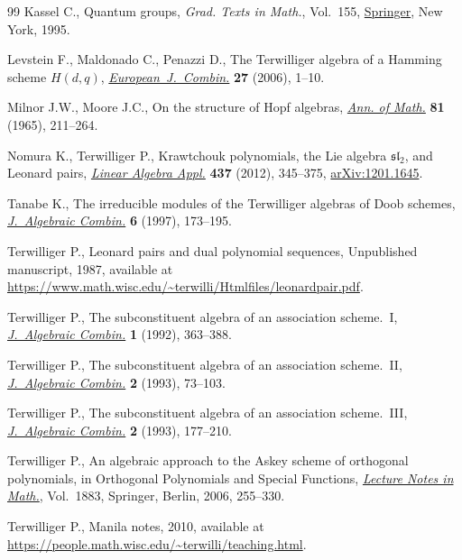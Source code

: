 \documentclass[pdftex]{sigma}%
\numberwithin{equation}{section}
\begin{document}
\begin{thebibliography}{99}
Kassel C., Quantum groups, \textit{Grad. Texts in Math.}, Vol.~155, \href{https://doi.org/10.1007/978-1-4612-0783-2}{Springer},
 New York, 1995.

Levstein F., Maldonado C., Penazzi D., The {T}erwilliger algebra of a {H}amming
 scheme {$H(d,q)$}, \href{https://doi.org/10.1016/j.ejc.2004.08.005}{\textit{European~J.~Combin.}} \textbf{27} (2006), 1--10.

Milnor J.W., Moore J.C., On the structure of {H}opf algebras, \href{https://doi.org/10.2307/1970615}{\textit{Ann. of
 Math.}} \textbf{81} (1965), 211--264.

Nomura K., Terwilliger P., Krawtchouk polynomials, the {L}ie algebra
 {$\mathfrak{sl}_2$}, and {L}eonard pairs, \href{https://doi.org/10.1016/j.laa.2012.02.006}{\textit{Linear Algebra Appl.}}
 \textbf{437} (2012), 345--375, \href{https://arxiv.org/abs/1201.1645}{arXiv:1201.1645}.

Tanabe K., The irreducible modules of the {T}erwilliger algebras of {D}oob
 schemes, \href{https://doi.org/10.1023/A:1008647205853}{\textit{J.~Algebraic Combin.}} \textbf{6} (1997), 173--195.

Terwilliger P., Leonard pairs and dual polynomial sequences, {U}npublished
 manuscript, 1987, available at
 \url{https://www.math.wisc.edu/~terwilli/Htmlfiles/leonardpair.pdf}.

Terwilliger P., The subconstituent algebra of an association scheme.~{I},
 \href{https://doi.org/10.1023/A:1022494701663}{\textit{J.~Algebraic Combin.}} \textbf{1} (1992), 363--388.

Terwilliger P., The subconstituent algebra of an association scheme.~{II},
 \href{https://doi.org/10.1023/A:1022480715311}{\textit{J.~Algebraic Combin.}} \textbf{2} (1993), 73--103.

Terwilliger P., The subconstituent algebra of an association scheme.~{III},
 \href{https://doi.org/10.1023/A:1022415825656}{\textit{J.~Algebraic Combin.}} \textbf{2} (1993), 177--210.

Terwilliger P., An algebraic approach to the {A}skey scheme of orthogonal
 polynomials, in Orthogonal Polynomials and Special Functions, \href{https://doi.org/10.1007/978-3-540-36716-1_6}{\textit{Lecture
 Notes in Math.}}, Vol.~1883, Springer, Berlin, 2006, 255--330.

 Terwilliger P., Manila notes, 2010, available at \url{https://people.math.wisc.edu/~terwilli/teaching.html}.


\end{thebibliography}
\end{document}
